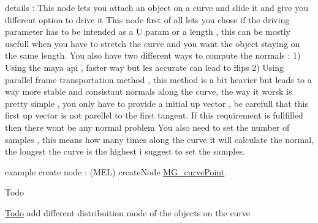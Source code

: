details \-: This node lets you attach an object on a curve and slide it and give you different option to drive it This node first of all lets you chose if the driving parameter has to be intended as a U param or a length , this can be mostly usefull when you have to stretch the curve and you want the object staying on the same length. You also have two different ways to compute the normals \-: 1) Using the maya api , faster way but les accurate can lead to flips 2) Using parallel frame transportation method , this method is a bit heavier but leads to a way more stable and consistant normals along the curve, the way it worsk is pretty simple , you only have to provide a initial up vector , be carefull that this first up vector is not parellel to the first tangent. If this requirement is fullfilled then there wont be any normal problem You also need to set the number of samples , this means how many times along the curve it will calculate the normal, the longest the curve is the highest i suggest to set the samples.

example create node \-: (M\-E\-L) create\-Node \hyperlink{class_m_g__curve_point}{M\-G\-\_\-curve\-Point}.

\begin{DoxyRefDesc}{Todo}
\item[\hyperlink{todo__todo000006}{Todo}]add different distribuition mode of the objects on the curve\end{DoxyRefDesc}


